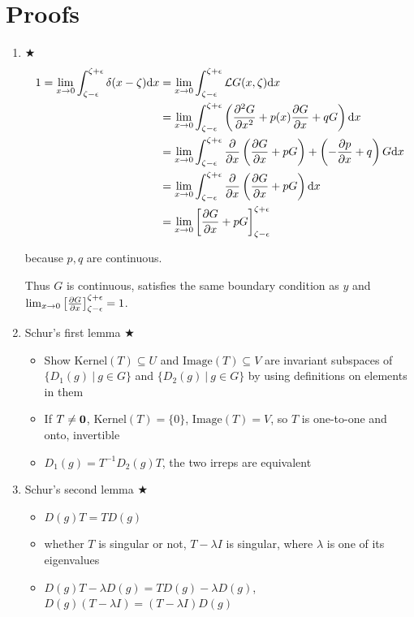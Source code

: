 \documentclass{article}
\theoremstyle{remark}
\theoremstyle{remark}
\newcommand{\wher}[1]{\begin{flushright}#1.\end{flushright}}
\newcommand{\myref}[1]{\hyperref[back:#1]{$\bigstar$}\label{#1}}
\begin{document}
    \section*{Proofs}
    \begin{enumerate}
        \item \myref{greens}\begin{align*}
            1 = \lim_{x\rightarrow0}\int_{\zeta-\epsilon}^{\zeta+\epsilon}\delta(x-\zeta)\dd x &= \lim_{x\rightarrow0}\int_{\zeta-\epsilon}^{\zeta+\epsilon}\mathcal{L}G(x,\zeta)\dd x\\
            &= \lim_{x\rightarrow0}\int_{\zeta-\epsilon}^{\zeta+\epsilon}\left(\pdv[2]{G}{x}+p(x)\pdv{G}{x}+qG\right)\dd x\\
            &= \lim_{x\rightarrow0}\int_{\zeta-\epsilon}^{\zeta+\epsilon}\pdv{x}\left(\pdv{G}{x}+pG\right) + \left(-\pdv{p}{x}+q\right)G\dd x\\
            &= \lim_{x\rightarrow0}\int_{\zeta-\epsilon}^{\zeta+\epsilon}\pdv{x}\left(\pdv{G}{x}+pG\right)\dd x\\
            &= \lim_{x\rightarrow0}\left[\pdv{G}{x}+pG\right]_{\zeta-\epsilon}^{\zeta+\epsilon}
        \end{align*} \wher{because $p,q$ are continuous}
        Thus $G$ is continuous, satisfies the same boundary condition as $y$ and $\lim_{x\rightarrow0}\left[\pdv{G}{x}\right]_{\zeta-\epsilon}^{\zeta+\epsilon}=1$.
        \item Schur's first lemma \myref{lma:schur1}\begin{itemize}
                \item Show $\mathrm{Kernel}(T)\subseteq U$ and $\mathrm{Image}(T)\subseteq V$ are invariant subspaces of $\{D_1(g)\ |\ g\in G\}$ and $\{D_2(g)\ |\ g\in G\}$ by using definitions on elements in them
                \item If $T\neq\vb{0}$, $\mathrm{Kernel}(T)=\{0\}$, $\mathrm{Image}(T)=V$, so $T$ is one-to-one and onto, invertible
                \item $D_1(g)=T^{-1}D_2(g)T$, the two irreps are equivalent
            \end{itemize}
        \item Schur's second lemma \myref{lma:schur2}\begin{itemize}
                \item $D(g)T=TD(g)$
                \item whether $T$ is singular or not, $T-\lambda I$ is singular, where $\lambda$ is one of its eigenvalues
                \item $D(g)T-\lambda D(g)=TD(g)-\lambda D(g)$, $D(g)(T-\lambda I)=(T-\lambda I)D(g)$

\end{itemize}
\end{enumerate}
\end{document}
